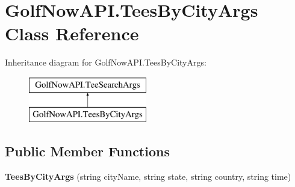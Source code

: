 \hypertarget{class_golf_now_a_p_i_1_1_tees_by_city_args}{}\section{Golf\+Now\+A\+P\+I.\+Tees\+By\+City\+Args Class Reference}
\label{class_golf_now_a_p_i_1_1_tees_by_city_args}
Inheritance diagram for Golf\+Now\+A\+P\+I.\+Tees\+By\+City\+Args\+:\begin{figure}[H]
\begin{center}
\leavevmode
\includegraphics[height=2.000000cm]{class_golf_now_a_p_i_1_1_tees_by_city_args}
\end{center}
\end{figure}
\subsection*{Public Member Functions}
\begin{DoxyCompactItemize}
\item 
\mbox{\label{class_golf_now_a_p_i_1_1_tees_by_city_args_a04d81552c40a04bacc066a3161181104}} 
{\bfseries Tees\+By\+City\+Args} (string city\+Name, string state, string country, string time)
\end{DoxyCompactItemize}
